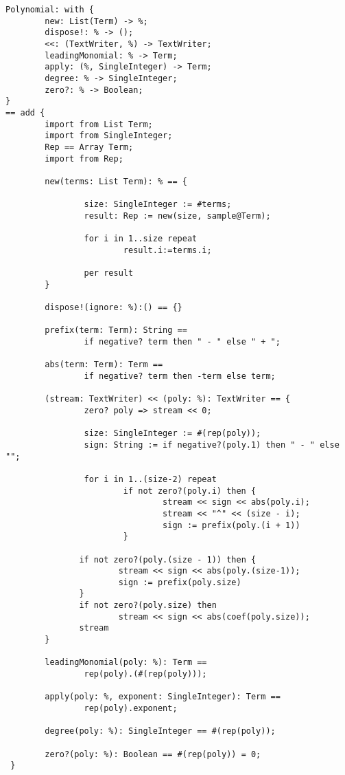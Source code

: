 \begin{small}
\begin{verbatim}
Polynomial: with {
        new: List(Term) -> %;
        dispose!: % -> ();
        <<: (TextWriter, %) -> TextWriter;
        leadingMonomial: % -> Term;
        apply: (%, SingleInteger) -> Term;
        degree: % -> SingleInteger;
        zero?: % -> Boolean;
}
== add {
        import from List Term;
        import from SingleInteger;
        Rep == Array Term;
        import from Rep;

        new(terms: List Term): % == {

                size: SingleInteger := #terms;
                result: Rep := new(size, sample@Term);

                for i in 1..size repeat
                        result.i:=terms.i;

                per result
        }

        dispose!(ignore: %):() == {}

        prefix(term: Term): String == 
                if negative? term then " - " else " + ";

        abs(term: Term): Term == 
                if negative? term then -term else term;

        (stream: TextWriter) << (poly: %): TextWriter == {
                zero? poly => stream << 0;

                size: SingleInteger := #(rep(poly));
                sign: String := if negative?(poly.1) then " - " else "";

                for i in 1..(size-2) repeat
                        if not zero?(poly.i) then {
                                stream << sign << abs(poly.i);
                                stream << "^" << (size - i);
                                sign := prefix(poly.(i + 1))
                        }

               if not zero?(poly.(size - 1)) then {
                       stream << sign << abs(poly.(size-1));
                       sign := prefix(poly.size)
               }
               if not zero?(poly.size) then 
                       stream << sign << abs(coef(poly.size));
               stream
        }              

        leadingMonomial(poly: %): Term == 
                rep(poly).(#(rep(poly)));

        apply(poly: %, exponent: SingleInteger): Term == 
                rep(poly).exponent;

        degree(poly: %): SingleInteger == #(rep(poly));

        zero?(poly: %): Boolean == #(rep(poly)) = 0;
 }


\end{verbatim}
\end{small}
